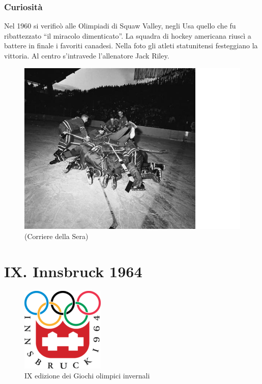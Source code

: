 \documentclass[
]{book}
\begin{document}
\subsection*{Curiosità}\label{curiosituxe0-1}

Nel 1960 si verificò alle Olimpiadi di Squaw Valley, negli Usa quello che fu ribattezzato ``il miracolo dimenticato''. La squadra di hockey americana riuscì a battere in finale i favoriti canadesi. Nella foto gli atleti statunitensi festeggiano la vittoria. Al centro s'intravede l'allenatore Jack Riley.

\begin{figure}
\includegraphics[width=0.8\linewidth]{images/corriere/1960} \caption{(Corriere della Sera)}\label{fig:unnamed-chunk-24}
\end{figure}

\chapter*{IX. Innsbruck 1964}\label{ix.-innsbruck-1964}

\begin{figure}
\includegraphics[width=0.4\linewidth]{images/loghi/1964} \caption{IX edizione dei Giochi olimpici invernali}\label{fig:unnamed-chunk-25}
\end{figure}
\end{document}
